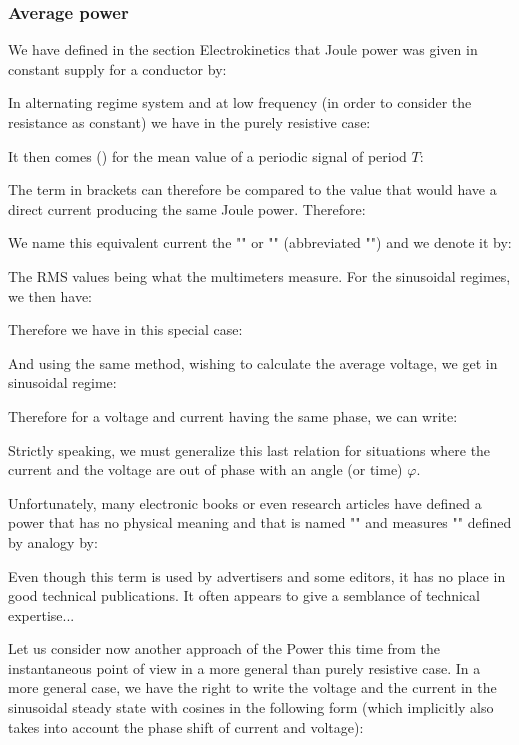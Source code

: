 	\subsubsection{Average power}
	We have defined in the section Electrokinetics that Joule power was given in constant supply for a conductor by:
	
	In alternating regime system and at low frequency (in order to consider the resistance as constant) we have in the purely resistive case:
	
	It then comes () for the mean value of a periodic signal of period $T$:
	
	The term in brackets can therefore be compared to the value that would have a direct current producing the same Joule power. Therefore:
	
	We name this equivalent current the "" or "" (abbreviated "") and we denote it by:
	
	The RMS values being what the multimeters measure. For the sinusoidal regimes, we then have:
	
	Therefore we have in this special case:
	
	And using the same method, wishing to calculate the average voltage, we get in sinusoidal regime:
	
	Therefore for a voltage and current having the same phase, we can write:
	
	Strictly speaking, we must generalize this last relation for situations where the current and the voltage are out of phase with an angle (or time) $\varphi$.
	\begin{tcolorbox}[title=Remark,colframe=black,arc=10pt]
	Unfortunately, many electronic books or even research articles have defined a power that has no physical meaning and that is named "" and measures "" defined by analogy by:
	
	Even though this term is used by advertisers and some editors, it has no place in good technical publications. It often appears to give a semblance of technical expertise...
	\end{tcolorbox}	
	Let us consider now another approach of the Power this time from the instantaneous point of view in a more general than purely resistive case. In a more general case, we have the right to write the voltage and the current in the sinusoidal steady state with cosines in the following form (which implicitly also takes into account the phase shift of current and voltage):
	
